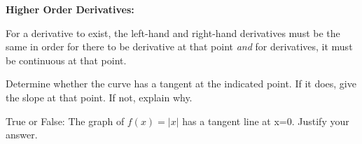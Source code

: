 \documentclass[addpoints, 12pt]{exam}
\begin{document}
\begin{questions}
    
    \question \textbf{Higher Order Derivatives:}
\end{questions}


\newpage

For a derivative to exist, the left-hand and right-hand derivatives must be the same in order for there to be derivative at that point \textit{and} for derivatives, it must be continuous at that point.
\begin{questions}
    \question Determine whether the curve has a tangent at the indicated point. If it does, give the slope at that point. If not, explain why.
    \question True or False: The graph of $f(x)=|x|$ has a tangent line at x=0. Justify your answer.
\end{questions}
\end{document}
